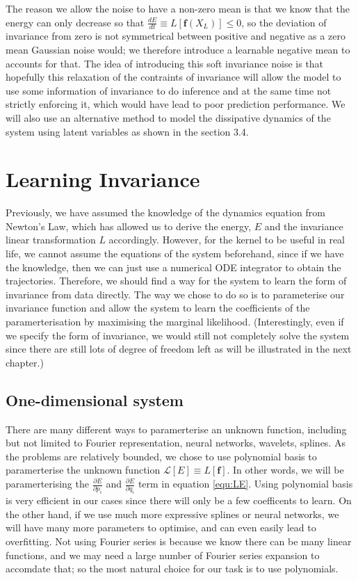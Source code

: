 \documentclass{statsmsc}
\begin{document}
The reason we allow the noise to have a non-zero mean is that we know that the energy can only decrease so that $\frac{dE}{dt}\equiv L[\mathbf{f}(X_L)] \le 0 $, so the deviation of invariance from zero is not symmetrical between positive and negative as a zero mean Gaussian noise would; we therefore introduce a learnable negative mean to accounts for that.  
The idea of introducing this soft invariance noise is that hopefully this relaxation of the contraints of invariance will allow the model to use some information of invariance to do inference and at the same time not strictly enforcing it, which would have lead to poor prediction performance. 
We will also use an alternative method to model the dissipative dynamics of the system using latent variables as shown in the section 3.4. 


\section{Learning Invariance}
Previously, we have assumed the knowledge of the dynamics equation from Newton's Law, which has allowed us to derive the energy, $E$ and the invariance linear transformation $L$ accordingly. 
However, for the kernel to be useful in real life, we cannot assume the equations of the system beforehand, since if we have the knowledge, then we can just use a numerical ODE integrator to obtain the trajectories. 
Therefore, we should find a way for the system to learn the form of invariance from data directly.
The way we chose to do so is to parameterise our invariance function and allow the system to learn the coefficients of the paramerterisation by maximising the marginal likelihood.
(Interestingly, even if we specify the form of invariance, we would still not completely solve the system since there are still lots of degree of freedom left as will be illustrated in the next chapter.) 

\subsection{One-dimensional system}
There are many different ways to paramerterise an unknown function, including but not limited to Fourier representation, neural networks, wavelets, splines.
As the problems are relatively bounded, we chose to use polynomial basis to paramerterise the unknown function $\mathcal{L}[E]\equiv L[\mathbf{f}]$.
In other words, we will be paramerterising the $\frac{\partial E}{\partial p_i}$ and $\frac{\partial E}{\partial q_i}$ term in equation \ref{equ:LE}.
Using polynomial basis is very efficient in our cases since there will only be a few coefficents to learn.
On the other hand, if we use much more expressive splines or neural networks, we will have many more parameters to optimise, and can even easily lead to overfitting.
Not using Fourier series is because we know there can be many linear functions, and we may need a large number of Fourier series expansion to accomdate that; so the most natural choice for our task is to use polynomials.
\end{document}
